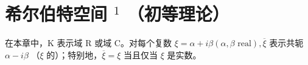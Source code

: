 \chapter{\texorpdfstring{希尔伯特空间 \(^{1}\) （初等理论）}{希尔伯特空间 \^{}\{1\} （初等理论）}}

在本章中，K 表示域 R 或域 C。对每个复数 \(\xi = \alpha + i\beta (\alpha, \beta \text{ real}), \overline{\xi}\) 表示共轭 \(\alpha - i\beta\) （\(\xi\) 的）；特别地，\(\overline{\xi} = \xi\) 当且仅当 \(\xi\) 是实数。

